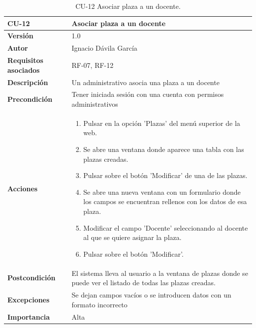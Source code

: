 \begin{table}[p]
	\centering
	\begin{tabularx}{\linewidth}{ p{} p{} }
		\toprule
		\textbf{CU-12}    & \textbf{Asociar plaza a un docente}\\
		\toprule
		\textbf{Versión}              & 1.0    \\
		\textbf{Autor}                & Ignacio Dávila García \\
		\textbf{Requisitos asociados} & RF-07, RF-12 \\
		\textbf{Descripción}          & Un administrativo asocia una plaza a un docente \\
		\textbf{Precondición}         & Tener iniciada sesión con una cuenta con permisos administrativos \\
		\textbf{Acciones}             &
		\begin{enumerate}
			\def\labelenumi{\arabic{enumi}.}
			\tightlist
			\item Pulsar en la opción 'Plazas' del menú superior de la web.
			\item Se abre una ventana donde aparece una tabla con las plazas creadas.
			\item Pulsar sobre el botón 'Modificar' de una de las plazas.
			\item Se abre una nueva ventana con un formulario donde los campos se encuentran rellenos con los datos de esa plaza.
			\item Modificar el campo 'Docente' seleccionando al docente al que se quiere asignar la plaza.
			\item Pulsar sobre el botón 'Modificar'.
		\end{enumerate}\\
		\textbf{Postcondición}        & El sistema lleva al usuario a la ventana de plazas donde se puede ver el listado de todas las plazas creadas. \\
		\textbf{Excepciones}          & Se dejan campos vacíos o se introducen datos con un formato incorrecto \\
		\textbf{Importancia}          & Alta \\
		\bottomrule
	\end{tabularx}
	\caption{CU-12 Asociar plaza a un docente.}
\end{table}
\FloatBarrier

